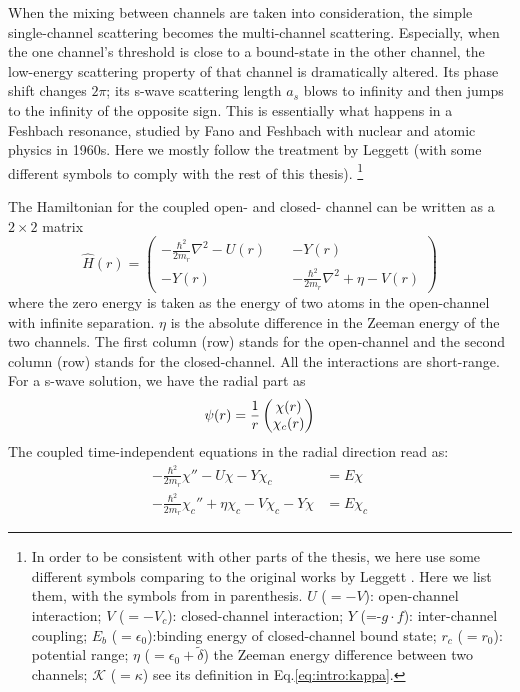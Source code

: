 When the mixing between channels are taken into consideration, the simple single-channel scattering becomes the multi-channel scattering.  Especially, when the one channel's threshold is close to a bound-state in the other channel, the low-energy scattering property of that channel is dramatically altered.  Its phase shift  changes $2\pi$;  its s-wave scattering length $a_{s}$ blows to infinity and then jumps to the infinity of the opposite sign.  This is essentially what happens in a Feshbach resonance, studied by Fano\cite{Fano} and Feshbach \cite{nuclear}  with nuclear and atomic physics in 1960s.  Here we  mostly follow the treatment by Leggett \cite{Leggett} (with some different symbols to comply with the rest of this thesis). 
\footnote{In order to be consistent  with  other parts of the thesis, we here use some different symbols comparing to the original works by Leggett \cite{Leggett}.  Here we list them, with the symbols from \cite{Leggett} in parenthesis.  $U$ ($=-V$): open-channel interaction; $V$ ($=-V_{c}$): closed-channel interaction; $Y$ (=-$g\cdot{}f$): inter-channel coupling; $E_{b}$ ($=\epsilon_{0}$):binding energy of closed-channel bound state; $r_{c}$ ($=r_{0}$): potential range; $\eta$ ($=\epsilon_0+\tilde\delta$) the Zeeman energy difference between two channels; $\mathcal{K}$ ($=\kappa$) see its definition in Eq.\ref{eq:intro:kappa}.}

The  Hamiltonian for  the coupled open- and  closed- channel can be written as a $2\times2$ matrix 
\begin{equation}\label{eq:intro:ham}
\hat{H}(r)=
\begin{pmatrix}
-\frac{\hbar^{2}}{2m_{r}}\nabla^{2}-U(r)&\;&-Y(r)\\
-Y(r)&\;&-\frac{\hbar^{2}}{2m_{r}}\nabla^{2}+\eta-V(r)
\end{pmatrix}
\end{equation}
where the  zero energy is taken as the energy of two atoms in the open-channel with infinite separation. $\eta$ is the absolute difference in the Zeeman energy of the two channels.  The first column (row) stands for the open-channel and the second column (row) stands for the closed-channel.  All the interactions are short-range.  For a s-wave solution, we have the radial part as 
\begin{equation}
\psi(r)=\frac{1}{r}\begin{pmatrix}\chi(r)\\\chi_{c}(r)\end{pmatrix}
\end{equation}
The coupled time-independent \sch equations in the radial direction read as:
\begin{align}
-\frac{\hbar^{2}}{2m_{r}}\chi''-U\chi-Y\chi_c&=E\chi\label{eq:intro:open}\\
-\frac{\hbar^{2}}{2m_{r}}\chi_c''+\eta\chi_c-V\chi_c-Y\chi&=E\chi_c\label{eq:intro:close}
\end{align}

